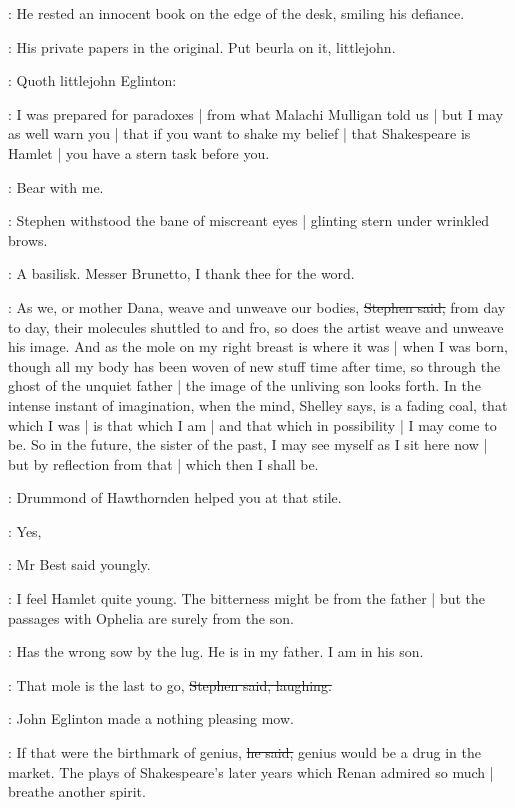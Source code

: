:
He rested an innocent book on the edge of the desk,
smiling his defiance.

\StephenInt:
His private papers in the original.
Put beurla on it,
littlejohn.

:
Quoth littlejohn Eglinton:

\eglinton:
I was prepared for paradoxes |
from what Malachi Mulligan told us |
but I may as well warn you |
that if you want to shake my belief |
that Shakespeare is Hamlet |
you have a stern task before you.

\StephenInt:
Bear with me.

:
Stephen withstood the bane of miscreant eyes |
glinting stern under wrinkled brows.

\StephenInt:
A basilisk.
Messer Brunetto,
I thank thee for the word.

\Stephen:
As we,
or mother Dana,
weave and unweave our bodies,
\sout{Stephen said,}
from day to day,
their molecules shuttled to and fro,
so does the artist weave and unweave his image.
And as the mole on my right breast is where it was |
when I was born,
though all my body has been woven of new stuff time after time,
so through the ghost of the unquiet father |
the image of the unliving son looks forth.
In the intense instant of imagination,
when the mind,
Shelley says,
is a fading coal,
that which I was |
is that which I am |
and that which in possibility |
I may come to be.
So in the future,
the sister of the past,
I may see myself as I sit here now |
but by reflection from that |
which then I shall be.

\StephenInt:
Drummond of Hawthornden helped you at that stile.

\best:
Yes,

:
Mr Best said youngly.

\best:
I feel Hamlet quite young.
The bitterness might be from the father |
but the passages with Ophelia are surely from the son.

\StephenInt:
Has the wrong sow by the lug.
He is in my father.
I am in his son.

\Stephen:
That mole is the last to go,
\sout{Stephen said, laughing.}

:
John Eglinton made a nothing pleasing mow.

\eglinton:
If that were the birthmark of genius,
\sout{he said,}
genius would be a drug in the market.
The plays of Shakespeare's later years which Renan admired so much |
breathe another spirit.

